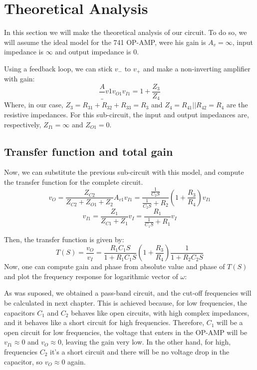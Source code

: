 \section{Theoretical Analysis}
\label{sec:analysis}

\par In this section we will make the theoretical analysis of our circuit. To do so, we will assume the ideal model for the 741 OP-AMP, were his gain is $A_v=\infty$, input impedance is $\infty$ and output impedance is $0$.

\par Using a feedback loop, we can stick $v_-$ to $v_+$ and make a non-inverting amplifier with gain: 
\begin{equation}
\frac A_{v1}{v_{O1}}{v_{I1}}=1+\frac{Z_3}{Z_4}
\end{equation}
Where, in our case, $Z_3=R_{31}+R_{32}+R_{33}=R_3$ and $Z_4=R_{41}||R_{42}=R_4$ are the resistive impedances. For this sub-circuit, the input and output impedances are, respectively, $Z_{I1}=\infty$ and $Z_{O1}=0$. 

\subsection{Transfer function and total gain}

\par Now, we can substitute the previous sub-circuit with this model, and compute the transfer function for the complete circuit. 
\begin{equation}
v_O=\frac{Z_{C2}}{Z_{C2}+Z_{O1}+Z_{2}}A_{v1}v_{I1}=\frac{\frac{1}{C_2S}}{\frac{1}{C_2S}+R_2}(1+\frac{R_3}{R_4})v_{I1}
\end{equation}
\begin{equation}
v_{I1}=\frac{Z_{1}}{Z_{C1}+Z_{1}}v_{I}=\frac{R_1}{\frac{1}{C_1S}+R_1}v_{I}
\end{equation}

Then, the transfer function is given by:
\begin{equation}
T(S)=\frac{v_O}{v_I}=\frac{R_1C_1S}{1+R_1C_1S}(1+\frac{R_3}{R_4})\frac{1}{1+R_2C_2S}
\end{equation}
 Now, one can compute gain and phase from absolute value and phase of $T(S)$ and plot the frequency response for logarithmic vector of $\omega$:
 
 \par As was suposed, we obtained a pass-band circuit, and the cut-off frequencies will be calculated in next chapter. This is achieved because, for low frequencies, the capacitors $C_1$ and $C_2$ behaves like open circuits, with high complex impedances, and it behaves like a short circuit for high frequencies. Therefore, $C_1$ will be a open circuit for low frequencies, the voltage that enters in the OP-AMP will be $v_{I1}\approx 0$ and $v_{O}\approx 0$, leaving the gain very low. In the other hand, for high, frequencies $C_2$ it's a short circuit and there will be no voltage drop in the capacitor, so $v_O\approx 0$ again.
 
